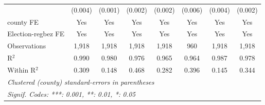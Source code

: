 \begin{table}[htbp]
\begin{tabular}{lccccccc}
                                                              & (0.004)        & (0.001)        & (0.002)                & (0.002)        & (0.006)        & (0.004)        & (0.002)\\   
      county FE                                               & Yes            & Yes            & Yes                    & Yes            & Yes            & Yes            & Yes\\  
      Election-regbez FE                                      & Yes            & Yes            & Yes                    & Yes            & Yes            & Yes            & Yes\\  
      Observations                                            & 1,918          & 1,918          & 1,918                  & 1,918          & 960            & 1,918          & 1,918\\  
      R$^2$                                                   & 0.990          & 0.980          & 0.976                  & 0.965          & 0.964          & 0.987          & 0.978\\  
      Within R$^2$                                            & 0.309          & 0.148          & 0.468                  & 0.282          & 0.396          & 0.145          & 0.344\\  
      \midrule \midrule
      \multicolumn{8}{l}{\emph{Clustered (county) standard-errors in parentheses}}\\
      \multicolumn{8}{l}{\emph{Signif. Codes: ***: 0.001, **: 0.01, *: 0.05}}\\
   \end{tabular}
\end{table}



